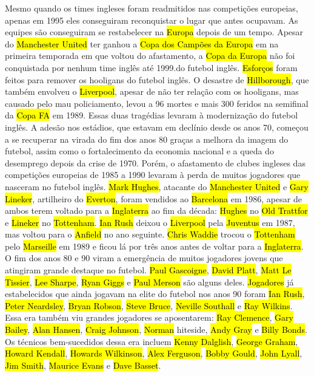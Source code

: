 \documentclass[a4paper,12pt]{article}
\begin{document}
Mesmo quando os times ingleses foram readmitidos nas competições europeias, apenas em 1995 eles conseguiram reconquistar o lugar que antes ocupavam. As equipes são conseguiram se restabelecer na \hl{Europa} depois de um tempo. Apesar do \hl{Manchester United} ter ganhou a \hl{Copa dos Campões da Europa} em na primeira temporada em que voltou do afastamento, a \hl{Copa da Europa} não foi conquistada por nenhum time inglês até 1999.do futebol inglês. \hl{Esforços} foram feitos para remover os hooligans do futebol inglês.
O desastre de \hl{Hillborough}, que também envolveu o \hl{Liverpool}, apesar de não ter relação com os hooligans, mas causado pelo mau policiamento, levou a 96 mortes e mais 300 feridos na semifinal da \hl{Copa FA} em 1989. Essas duas tragédias levaram à modernização do futebol inglês. A adesão nos estádios, que estavam em declínio desde os anos 70, começou a se recuperar na virada do fim dos anos 80 graças a melhora da imagem do futebol, assim como o fortalecimento da economia nacional e a queda do desemprego depois da crise de 1970. Porém, o afastamento de clubes ingleses das competições europeias de 1985 a 1990 levaram à perda de muitos jogadores que nasceram no futebol inglês. \hl{Mark Hughes}, atacante do \hl{Manchester United} e \hl{Gary Lineker}, artilheiro do \hl{Everton}, foram vendidos ao \hl{Barcelona} em 1986, apesar de ambos terem voltado para a \hl{Inglaterra} ao fim da década: \hl{Hughes} no \hl{Old Trattfor} e \hl{Lineker} no \hl{Tottenham}. \hl{Ian Rush} deixou o \hl{Liverpool} pela \hl{Juventus} em 1987, mas voltou para o \hl{Anfield} no ano seguinte. \hl{Chris Waddie} trocou o \hl{Tottenham} pelo \hl{Marseille} em 1989 e ficou lá por três anos antes de voltar para a \hl{Inglaterra}.
O fim dos anos 80 e 90 viram a emergência de muitos jogadores jovens que atingiram grande destaque no futebol. \hl{Paul Gascoigne}, \hl{David Platt}, \hl{Matt Le Tissier}, \hl{Lee Sharpe}, \hl{Ryan Giggs} e \hl{Paul Merson} são alguns deles. \hl{Jogadores} já estabelecidos que ainda jogavam na elite do futebol nos anos 90 foram \hl{Ian Rush}, \hl{Peter Neardsley}, \hl{Bryan Robson}, \hl{Steve Bruce}, \hl{Neville Southall} e \hl{Ray Wilkins}. Essa era também viu grandes jogadores se aposentarem: \hl{Ray Clemence}, \hl{Gary Bailey}, \hl{Alan Hansen}, \hl{Craig Johnson}, \hl{Norman} hiteside, \hl{Andy Gray} e \hl{Billy Bonds}.
Os técnicos bem-sucedidos dessa era incluem \hl{Kenny Dalglish}, \hl{George Graham}, \hl{Howard Kendall}, \hl{Howards Wilkinson}, \hl{Alex Ferguson}, \hl{Bobby Gould}, \hl{John Lyall}, \hl{Jim Smith}, \hl{Maurice Evans} e \hl{Dave Basset}.
\end{document}

